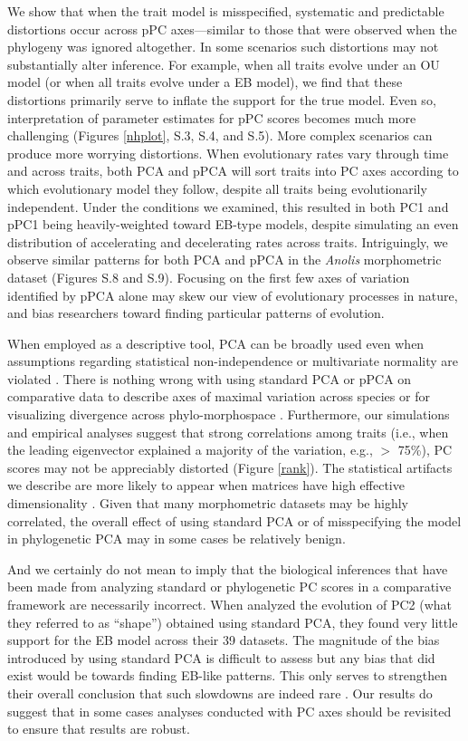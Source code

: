 \documentclass[a4paper,11pt]{article}
\begin{document}
We show that when the trait model is misspecified, systematic and predictable distortions occur across pPC axes---similar to those that were observed when the phylogeny was ignored altogether. In some scenarios such distortions may not substantially alter inference. For example, when all traits evolve under an OU model (or when all traits evolve under a EB model), we find that these distortions primarily serve to inflate the support for the true model. Even so, interpretation of parameter estimates for pPC scores becomes much more challenging (Figures \ref{nhplot}, S.3, S.4, and S.5). More complex scenarios can produce more worrying distortions. When evolutionary rates vary through time and across traits, both PCA and pPCA will sort traits into PC axes according to which evolutionary model they follow, despite all traits being evolutionarily independent. Under the conditions we examined, this resulted in both PC1 and pPC1 being heavily-weighted toward EB-type models, despite simulating an even distribution of accelerating and decelerating rates across traits. Intriguingly, we observe similar patterns for both PCA and pPCA in the \textit{Anolis} morphometric dataset (Figures S.8 and S.9). Focusing on the first few axes of variation identified by pPCA alone may skew our view of evolutionary processes in nature, and bias researchers toward finding particular patterns of evolution. 

When employed as a descriptive tool, PCA can be broadly used even when assumptions regarding statistical non-independence or multivariate normality are violated \citep{Jolliffe2002}. There is nothing wrong with using standard PCA or pPCA on comparative data to describe axes of maximal variation across species or for visualizing divergence across phylo-morphospace \citep{Sidlauskas2008}. Furthermore, our simulations and empirical analyses suggest that strong correlations among traits (i.e., when the leading eigenvector explained a majority of the variation, e.g., $>$ 75\%), PC scores may not be appreciably distorted (Figure \ref{rank}). The statistical artifacts we describe are more likely to appear when matrices have high effective dimensionality \citep[see][]{Bookstein2012}. Given that many morphometric datasets may be highly correlated, the overall effect of using standard PCA or of misspecifying the model in phylogenetic PCA may in some cases be relatively benign. 

And we certainly do not mean to imply that the biological inferences that have been made from analyzing standard or phylogenetic PC scores in a comparative framework are necessarily incorrect. When \citet{Harmon2010} analyzed the evolution of PC2 (what they referred to as ``shape'') obtained using standard PCA, they found very little support for the EB model across their 39 datasets. The magnitude of the bias introduced by using standard PCA is difficult to assess but any bias that did exist would be towards finding EB-like patterns. This only serves to strengthen their overall conclusion that such slowdowns are indeed rare \citep[but see][]{SlaterPennell}. Our results do suggest that in some cases analyses conducted with PC axes should be revisited to ensure that results are robust.
\end{document}
